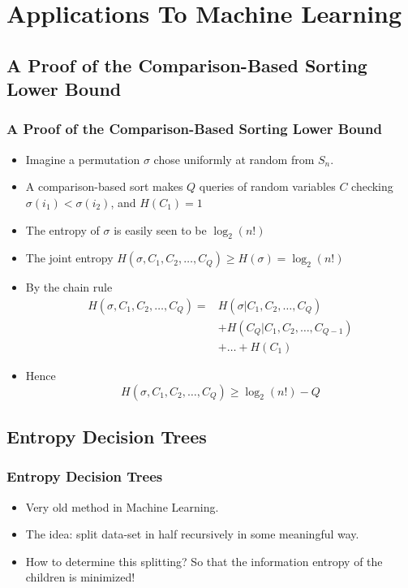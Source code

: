 \documentclass[xcolor=dvipsnames]{beamer}
\begin{document}
	
	\section{Applications To Machine Learning}
	
	\subsection{A Proof of the Comparison-Based Sorting Lower Bound}
	\begin{frame}
	\frametitle{A Proof of the Comparison-Based Sorting Lower Bound}
    	\begin{itemize}
    	    \item Imagine a permutation $\sigma$ chose uniformly at random from $S_n$. 
    	    \item A comparison-based sort makes $Q$ queries of random variables $C$ checking $\sigma(i_1) < \sigma(i_2)$, and $H(C_1) = 1$
    	    \item The entropy of $\sigma$ is easily seen to be $\log_2(n!)$
    	    \item The joint entropy $H(\sigma, C_1, C_2, \dots, C_Q) \geq H(\sigma) = \log_2(n!)$
    	    \item By the chain rule \begin{align*}
    	     H(\sigma, C_1, C_2, \dots, C_Q) = & H(\sigma|C_1, C_2, \dots, C_Q) \\ & + H(C_Q|C_1, C_2, \dots, C_{Q-1}) \\ & + \dots  + H(C_1)\end{align*}
    	     \item Hence $$ H(\sigma, C_1, C_2, \dots, C_Q) \geq \log_2(n!) - Q $$ 
    	\end{itemize}
	\end{frame}
	
	\subsection{Entropy Decision Trees}
	\begin{frame}
	\frametitle{Entropy Decision Trees}
	\begin{itemize}
    	\item Very old method in Machine Learning. 
    	\pause 
    	\item The idea: split data-set in half recursively in some meaningful way. 
    	\pause
    	\item How to determine this splitting? So that the information entropy of the children is minimized!
	\end{itemize}
	\end{frame}
	
\end{document}
